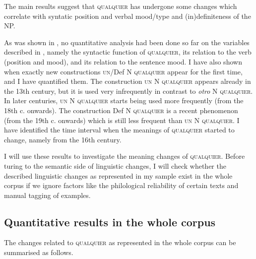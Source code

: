 The main results suggest that \textsc{qualquier} has undergone some changes which correlate with syntatic position and verbal mood/type and (in)definiteness of the NP.

As was shown in , no quantitative analysis had been done so far on the variables described in , namely the syntactic function of \textsc{qualquier}, its relation to the verb (position and mood), and its relation to the sentence mood. I have also shown when exactly new constructions \textsc{un}/Def N \textsc{qualquier} appear for the first time, and I have quantified them. The construction \textsc{un} N \textsc{qualquier} appears already in the 13th century, but it is used very infrequently in contrast to \textit{otro} N \textsc{qualquier}. In later centuries, \textsc{un} N \textsc{qualquier} starts being used more frequently (from the 18th c. onwards). The construction Def N \textsc{qualquier} is a recent phenomenon (from the 19th c. onwards) which is still less frequent than \textsc{un} N \textsc{qualquier.} I have identified the time interval when the meanings of \textsc{qualquier} started to change, namely from the 16th century.

I will use these results to investigate the meaning changes of \textsc{qualquier}. Before turing to the semantic side of linguistic changes, I will check whether the described linguistic changes as represented in my sample exist in the whole corpus if we ignore factors like the philological reliability of certain texts and manual tagging of examples.


\subsection{Quantitative results in the whole corpus}\label{sec:5.2.4-0} %

The changes related to \textsc{qualquier} as represented in the whole corpus can be summarised as follows.


